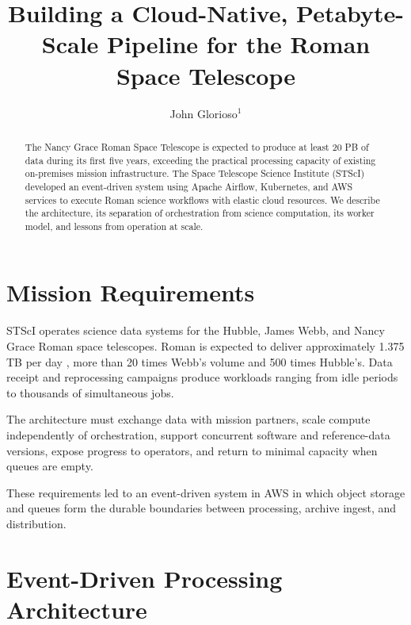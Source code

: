 \documentclass[11pt,twoside]{article}
\begin{document}
\title{Building a Cloud-Native, Petabyte-Scale Pipeline for the Roman Space Telescope}

\author{John Glorioso$^1$}




\begin{abstract}
The Nancy Grace Roman Space Telescope is expected to produce at least 20 PB of data during its first five years, exceeding the practical processing capacity of existing on-premises mission infrastructure. The Space Telescope Science Institute (STScI) developed an event-driven system using Apache Airflow, Kubernetes, and AWS services to execute Roman science workflows with elastic cloud resources. We describe the architecture, its separation of orchestration from science computation, its worker model, and lessons from operation at scale.
\end{abstract}

\section{Mission Requirements}

STScI operates science data systems for the Hubble, James Webb, and Nancy Grace Roman space telescopes. Roman is expected to deliver approximately 1.375 TB per day \citep{GSFC13667}, more than 20 times Webb's volume and 500 times Hubble's. Data receipt and reprocessing campaigns produce workloads ranging from idle periods to thousands of simultaneous jobs.

The architecture must exchange data with mission partners, scale compute independently of orchestration, support concurrent software and reference-data versions, expose progress to operators, and return to minimal capacity when queues are empty.

These requirements led to an event-driven system in AWS in which object storage and queues form the durable boundaries between processing, archive ingest, and distribution.

\section{Event-Driven Processing Architecture}
\end{document}
